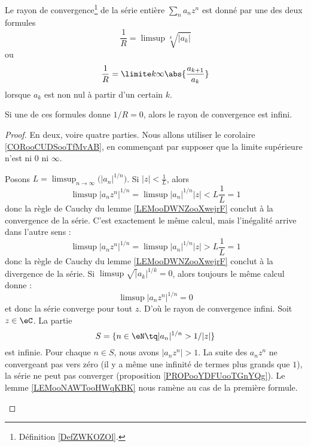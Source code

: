\begin{theorem} \label{ThoSerPuissRap}
	Le rayon de convergence\footnote{Définition \ref{DefZWKOZOl}.} de la série entière \( \sum_n a_n z^n\) est donné par une des deux formules
	\begin{equation}		\label{EqRayCOnvSer}
		\frac{1}{ R } =\limsup\sqrt[k]{| a_k |}
	\end{equation}
	ou
	\begin{equation}		\label{EqAlphaSerPuissAtern}
		\frac{1}{ R }=\limite k \infty \abs{\frac{a_{k+1}}{a_k}}
	\end{equation}
	lorsque \( a_k\) est non nul à partir d'un certain \( k\).

	Si une de ces formules donne \( 1/R=0\), alors le rayon de convergence est infini.
\end{theorem}

\begin{proof}
	En deux, voire quatre parties. Nous allons utiliser le corolaire \ref{CORooCUDSooTfMvAB}, en commençant par supposer que la limite supérieure n'est ni \( 0\) ni \( \infty\).
	\begin{subproof}
		Posons \( L=\limsup_{n\to \infty}\big( | a_n |^{1/n} \big)\). Si \( | z |<\frac{1}{ L }\), alors
		\begin{equation}
			\limsup| a_nz^n |^{1/n}= \limsup| a_n |^{1/n}| z |
			<L\frac{1}{ L }
			=1
		\end{equation}
		donc la règle de Cauchy du lemme \ref{LEMooDWNZooXwejrF} conclut à la convergence de la série.
		C'est exactement le même calcul, mais l'inégalité arrive dans l'autre sens :
		\begin{equation}
			\limsup| a_nz^n |^{1/n}= \limsup| a_n |^{1/n}| z |
			>L\frac{1}{ L }
			=1
		\end{equation}
		donc la règle de Cauchy du lemme \ref{LEMooDWNZooXwejrF} conclut à la divergence de la série.
		Si \( \limsup\sqrt| a_k |^{1/k}=0\), alors toujours le même calcul donne :
		\begin{equation}
			\limsup| a_nz^n |^{1/n}=0
		\end{equation}
		et donc la série converge pour tout \( z\). D'où le rayon de convergence infini.
		Soit \( z\in \eC\). La partie
		\begin{equation}
			S=\{ n\in \eN\tq | a_n |^{1/n}>1/| z | \}
		\end{equation}
		est infinie. Pour chaque \( n\in S\), nous avons \( | a_n z^n |>1\). La suite des \( a_nz^n\) ne convergeant pas vers zéro (il y a même une infinité de termes plus grands que \( 1\)), la série ne peut pas converger (proposition \ref{PROPooYDFUooTGnYQg}).
		Le lemme \ref{LEMooNAWTooHWqKBK} nous ramène au cas de la première formule.
	\end{subproof}
\end{proof}

